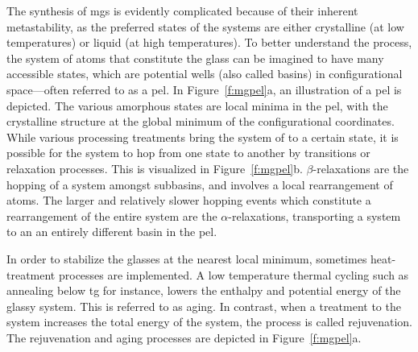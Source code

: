 The synthesis of \gls{mg}s is evidently complicated because of their inherent metastability, as the preferred states of the systems are either crystalline (at low temperatures) or liquid (at high temperatures). To better understand the process, the system of atoms that constitute the glass can be imagined to have many accessible states, which are potential wells (also called basins) in configurational space---often referred to as a \gls{pel}. In Figure~\ref{f:mgpel}a, an illustration of a \gls{pel} is depicted. The various amorphous states are local minima in the \gls{pel}, with the crystalline structure at the global minimum of the configurational coordinates. While various processing treatments bring the system of to a certain state, it is possible for the system to hop from one state to another by transitions or relaxation processes. This is visualized in Figure~\ref{f:mgpel}b. $\beta$-relaxations are the hopping of a system amongst subbasins, and involves a local rearrangement of atoms. The larger and relatively slower hopping events which constitute a rearrangement of the entire system are the $\alpha$-relaxations, transporting a system to an an entirely different basin in the \gls{pel}. \par

In order to stabilize the glasses at the nearest local minimum, sometimes heat-treatment processes are implemented. A low temperature thermal cycling such as annealing below \gls{tg} for instance, lowers the enthalpy and potential energy of the glassy system. This is referred to as aging. In contrast, when a treatment to the system increases the total energy of the system, the process is called rejuvenation. The rejuvenation and aging processes are depicted in Figure~\ref{f:mgpel}a. %

